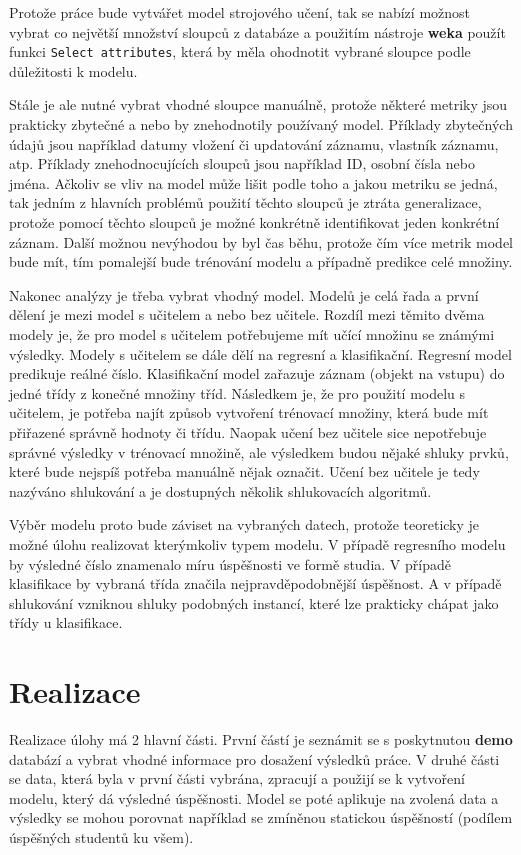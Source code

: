 \documentclass[12pt, letterpaper]{article}
\begin{document}
Protože práce bude vytvářet model strojového učení, tak se nabízí možnost vybrat co největší množství sloupců z databáze
a použitím nástroje \textbf{weka} použít funkci \texttt{Select attributes}, která by měla ohodnotit vybrané sloupce 
podle důležitosti k modelu.

Stále je ale nutné vybrat vhodné sloupce manuálně, protože některé metriky jsou prakticky zbytečné a nebo by 
znehodnotily používaný model. Příklady zbytečných údajů jsou například datumy vložení či updatování záznamu, vlastník
záznamu, atp. Příklady znehodnocujících sloupců jsou například ID, osobní čísla nebo jména. Ačkoliv se vliv na model
může lišit podle toho a jakou metriku se jedná, tak jedním z hlavních problémů použití těchto sloupců je ztráta 
generalizace, protože pomocí těchto sloupců je možné konkrétně identifikovat jeden konkrétní záznam. Další možnou
nevýhodou by byl čas běhu, protože čím více metrik model bude mít, tím pomalejší bude trénování modelu a případně
predikce celé množiny.

Nakonec analýzy je třeba vybrat vhodný model. Modelů je celá řada a první dělení je mezi model s učitelem a nebo bez
učitele. Rozdíl mezi těmito dvěma modely je, že pro model s učitelem potřebujeme mít učící množinu se známými výsledky.
Modely s učitelem se dále dělí na regresní a klasifikační. Regresní model predikuje reálné číslo. Klasifikační model
zařazuje záznam (objekt na vstupu) do jedné třídy z konečné množiny tříd. Následkem je, že pro použití modelu s 
učitelem, je potřeba najít způsob vytvoření trénovací množiny, která bude mít přiřazené správně hodnoty či třídu.
Naopak učení bez učitele sice nepotřebuje správné výsledky v trénovací množině, ale výsledkem budou nějaké shluky prvků,
které bude nejspíš potřeba manuálně nějak označit. Učení bez učitele je tedy nazýváno shlukování a je dostupných 
několik shlukovacích algoritmů. 

Výběr modelu proto bude záviset na vybraných datech, protože teoreticky je možné úlohu realizovat kterýmkoliv typem 
modelu. V případě regresního modelu by výsledné číslo znamenalo míru úspěšnosti ve formě studia. V případě klasifikace 
by vybraná třída značila nejpravděpodobnější úspěšnost. A v případě shlukování vzniknou shluky podobných instancí, 
které lze prakticky chápat jako třídy u klasifikace.
\section{Realizace}
Realizace úlohy má 2 hlavní části. První částí je seznámit se s poskytnutou \textbf{demo} databází a vybrat vhodné 
informace pro dosažení výsledků práce. V druhé části se data, která byla v první části vybrána, zpracují a použijí
se k vytvoření modelu, který dá výsledné úspěšnosti. Model se poté aplikuje na zvolená data a výsledky se mohou 
porovnat například se zmíněnou statickou úspěšností (podílem úspěšných studentů ku všem).
\end{document}
